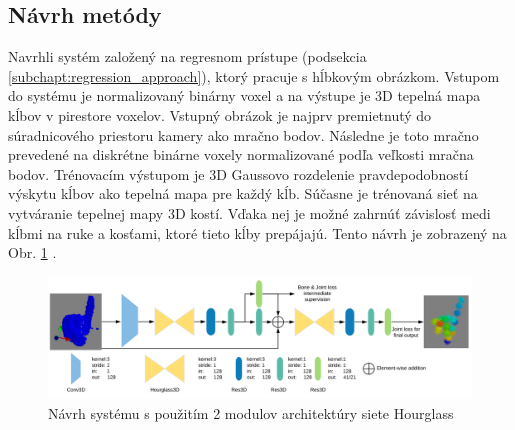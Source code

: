 \subsection{Návrh metódy}
Navrhli systém založený na regresnom prístupe (podsekcia \ref{subchapt:regression_approach}), ktorý pracuje s hĺbkovým obrázkom. Vstupom do systému je normalizovaný binárny voxel a na výstupe je 3D tepelná mapa kĺbov v pirestore voxelov. Vstupný obrázok je najprv premietnutý do súradnicového priestoru kamery ako mračno bodov. Následne je toto mračno prevedené na diskrétne binárne voxely normalizované podľa veľkosti mračna bodov. Trénovacím výstupom je 3D Gaussovo rozdelenie pravdepodobností výskytu kĺbov ako tepelná mapa pre každý kĺb. Súčasne je trénovaná sieť na vytváranie tepelnej mapy 3D kostí. Vďaka nej je možné zahrnúť závislosť medi kĺbmi na ruke a kosťami, ktoré tieto kĺby prepájajú. Tento návrh je zobrazený na Obr. \ref{img:FuyangFramework} \cite{DBLP:journals/corr/hourglass}.

\begin{figure}[H]
	\begin{center}
		\includegraphics[width=\textwidth]{images/231hourglass.png}
		\caption{Návrh systému s použitím 2 modulov architektúry siete Hourglass}
		\label{img:FuyangFramework}
	\end{center}
\end{figure}

